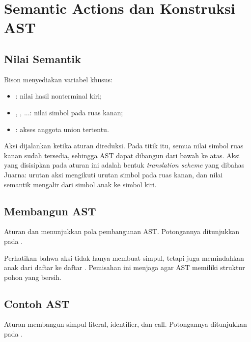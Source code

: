\section{Semantic Actions dan Konstruksi AST}
\label{sec:ch13-semantic}

\subsection{Nilai Semantik}

Bison menyediakan variabel khusus:
\begin{itemize}[leftmargin=*]
  \item \code{\$\$}: nilai hasil nonterminal kiri;
  \item {}, , ...: nilai simbol pada ruas kanan;
  \item {}: akses anggota union tertentu.
\end{itemize}

Aksi dijalankan ketika aturan direduksi. Pada titik itu, semua nilai
simbol ruas kanan sudah tersedia, sehingga AST dapat dibangun dari
bawah ke atas. Aksi yang disisipkan pada aturan ini adalah bentuk
\emph{translation scheme} yang dibahas Juarna: urutan aksi mengikuti
urutan simbol pada ruas kanan, dan nilai semantik mengalir dari
simbol anak ke simbol kiri.

\subsection{Membangun AST}

Aturan  dan  menunjukkan pola
pembangunan AST. Potongannya ditunjukkan pada
.


Perhatikan bahwa aksi tidak hanya membuat simpul, tetapi juga
memindahkan anak dari daftar  ke daftar .
Pemisahan ini menjaga agar AST memiliki struktur pohon yang bersih.

\subsection{Contoh AST}

Aturan  membangun simpul literal, identifier, dan call.
Potongannya ditunjukkan pada .

